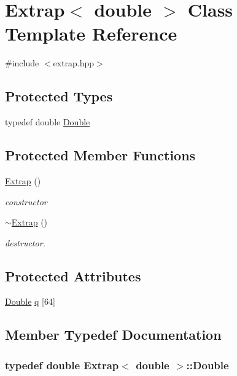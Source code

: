 \hypertarget{classExtrap_3_01double_01_4}{\section{Extrap$<$ double $>$ Class Template Reference}
\label{classExtrap_3_01double_01_4}
}


{\ttfamily \#include $<$extrap.\-hpp$>$}

\subsection*{Protected Types}
\begin{DoxyCompactItemize}
\item 
typedef double \hyperlink{classExtrap_3_01double_01_4_a5b3a506673d507e40d4c92bd7f5f6671}{Double}
\end{DoxyCompactItemize}
\subsection*{Protected Member Functions}
\begin{DoxyCompactItemize}
\item 
\hyperlink{classExtrap_3_01double_01_4_a755d7cf614e92b3ce79a60c4131aae52}{Extrap} ()
\begin{DoxyCompactList}\small\item\em constructor \end{DoxyCompactList}\item 
\hyperlink{classExtrap_3_01double_01_4_a11e3eb6433e8f88c95e7ee6d0b229046}{$\sim$\-Extrap} ()
\begin{DoxyCompactList}\small\item\em destructor. \end{DoxyCompactList}\end{DoxyCompactItemize}
\subsection*{Protected Attributes}
\begin{DoxyCompactItemize}
\item 
\hyperlink{classExtrap_3_01double_01_4_a5b3a506673d507e40d4c92bd7f5f6671}{Double} \hyperlink{classExtrap_3_01double_01_4_a3bbefd2a1fb931a7bf473267966084b5}{q} \mbox{[}64\mbox{]}
\end{DoxyCompactItemize}


\subsection{Member Typedef Documentation}
\hypertarget{classExtrap_3_01double_01_4_a5b3a506673d507e40d4c92bd7f5f6671}{
\subsubsection[{Double}]{\setlength{\rightskip}{0pt plus 5cm}typedef double {\bf Extrap}$<$ double $>$\-::{\bf Double}\hspace{0.3cm}{\ttfamily [protected]}}}\label{classExtrap_3_01double_01_4_a5b3a506673d507e40d4c92bd7f5f6671}


